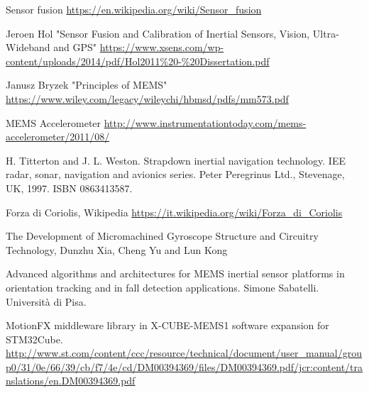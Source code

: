 \begin{thebibliography}{99}
Sensor fusion
\url{https://en.wikipedia.org/wiki/Sensor_fusion}

Jeroen Hol "Sensor Fusion and Calibration of
Inertial Sensors, Vision,
Ultra-Wideband and GPS"
\url{https://www.xsens.com/wp-content/uploads/2014/pdf/Hol2011%20-%20Dissertation.pdf}

Janusz Bryzek "Principles of MEMS"
\url{https://www.wiley.com/legacy/wileychi/hbmsd/pdfs/mm573.pdf}


MEMS Accelerometer
\url{http://www.instrumentationtoday.com/mems-accelerometer/2011/08/}


H. Titterton and J. L. Weston. Strapdown inertial navigation technology. IEE
radar, sonar, navigation and avionics series. Peter Peregrinus Ltd., Stevenage,
UK, 1997. ISBN 0863413587.

Forza di Coriolis, Wikipedia
\url{https://it.wikipedia.org/wiki/Forza_di_Coriolis}

The Development of Micromachined Gyroscope Structure and
Circuitry Technology, Dunzhu Xia, Cheng Yu and Lun Kong


Advanced algorithms and architectures for MEMS inertial sensor platforms 
in orientation tracking and in fall detection applications. Simone Sabatelli.
Università di Pisa.

MotionFX middleware library in X-CUBE-MEMS1 software
expansion for STM32Cube.\\
\url{http://www.st.com/content/ccc/resource/technical/document/user_manual/group0/31/0e/66/39/cb/f7/4e/cd/DM00394369/files/DM00394369.pdf/jcr:content/translations/en.DM00394369.pdf}


\end{thebibliography}



